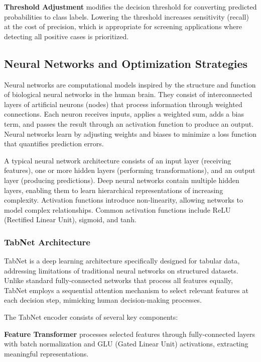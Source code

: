 \textbf{Threshold Adjustment} modifies the decision threshold for converting predicted probabilities to class labels. Lowering the threshold increases sensitivity (recall) at the cost of precision, which is appropriate for screening applications where detecting all positive cases is prioritized.

\subsection{Neural Networks and Optimization Strategies}

Neural networks are computational models inspired by the structure and function of biological neural networks in the human brain. They consist of interconnected layers of artificial neurons (nodes) that process information through weighted connections. Each neuron receives inputs, applies a weighted sum, adds a bias term, and passes the result through an activation function to produce an output. Neural networks learn by adjusting weights and biases to minimize a loss function that quantifies prediction errors.

A typical neural network architecture consists of an input layer (receiving features), one or more hidden layers (performing transformations), and an output layer (producing predictions). Deep neural networks contain multiple hidden layers, enabling them to learn hierarchical representations of increasing complexity. Activation functions introduce non-linearity, allowing networks to model complex relationships. Common activation functions include ReLU (Rectified Linear Unit), sigmoid, and tanh.

\subsubsection{TabNet Architecture}

TabNet is a deep learning architecture specifically designed for tabular data, addressing limitations of traditional neural networks on structured datasets. Unlike standard fully-connected networks that process all features equally, TabNet employs a sequential attention mechanism to select relevant features at each decision step, mimicking human decision-making processes.

The TabNet encoder consists of several key components:

\textbf{Feature Transformer} processes selected features through fully-connected layers with batch normalization and GLU (Gated Linear Unit) activations, extracting meaningful representations.

